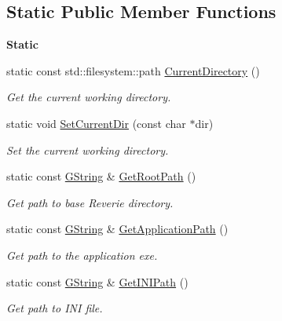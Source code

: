 \subsection*{Static Public Member Functions}
\begin{Indent}\textbf{ Static}\par
\begin{DoxyCompactItemize}
\item 
\mbox{\label{classrev_1_1_file_manager_ad47b0ba0a8bbc9e335a9f2cd045498af}} 
static const std\+::filesystem\+::path \mbox{\hyperlink{classrev_1_1_file_manager_ad47b0ba0a8bbc9e335a9f2cd045498af}{Current\+Directory}} ()
\begin{DoxyCompactList}\small\item\em Get the current working directory. \end{DoxyCompactList}\item 
\mbox{\label{classrev_1_1_file_manager_a520551ab305847a5ba831609ba647aaa}} 
static void \mbox{\hyperlink{classrev_1_1_file_manager_a520551ab305847a5ba831609ba647aaa}{Set\+Current\+Dir}} (const char $\ast$dir)
\begin{DoxyCompactList}\small\item\em Set the current working directory. \end{DoxyCompactList}\item 
\mbox{\label{classrev_1_1_file_manager_ac0e816c27d416878126b59a61f784a71}} 
static const \mbox{\hyperlink{classrev_1_1_g_string}{G\+String}} \& \mbox{\hyperlink{classrev_1_1_file_manager_ac0e816c27d416878126b59a61f784a71}{Get\+Root\+Path}} ()
\begin{DoxyCompactList}\small\item\em Get path to base Reverie directory. \end{DoxyCompactList}\item 
\mbox{\label{classrev_1_1_file_manager_abf583b5a91ecdb080ea76ecbbbc630e1}} 
static const \mbox{\hyperlink{classrev_1_1_g_string}{G\+String}} \& \mbox{\hyperlink{classrev_1_1_file_manager_abf583b5a91ecdb080ea76ecbbbc630e1}{Get\+Application\+Path}} ()
\begin{DoxyCompactList}\small\item\em Get path to the application exe. \end{DoxyCompactList}\item 
\mbox{\label{classrev_1_1_file_manager_a57dd0931cdb0f9d440f20ee328ccd5da}} 
static const \mbox{\hyperlink{classrev_1_1_g_string}{G\+String}} \& \mbox{\hyperlink{classrev_1_1_file_manager_a57dd0931cdb0f9d440f20ee328ccd5da}{Get\+I\+N\+I\+Path}} ()
\begin{DoxyCompactList}\small\item\em Get path to I\+NI file. \end{DoxyCompactList}\end{DoxyCompactItemize}
\end{Indent}
